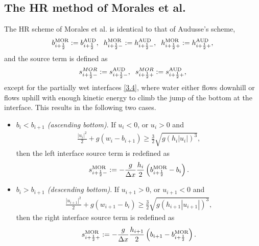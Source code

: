 \documentclass[11pt,a4paper,center,notitlepage]{article}
\numberwithin{equation}{section}
\begin{document}
\subsection{The HR method of Morales et al.}
The HR scheme of Morales et al. \cite{Morales2013} is identical to that of Audusse's scheme,
\begin{align}
b_{i + \frac{1}{2}}^{\rm MOR}: = b_{i + \frac{1}{2}}^{\rm AUD}, \hspace{2mm} h_{i + \frac{1}{2} - }^{\rm MOR}: = h_{i + \frac{1}{2} - }^{\rm AUD}, \hspace{2mm} h_{i + \frac{1}{2} + }^{\rm MOR}: = h_{i + \frac{1}{2} + }^{\rm AUD},
\end{align}
and the source term is defined as
\begin{align}
s_{i + \frac{1}{2} - }^{MOR}: = s_{i + \frac{1}{2} - }^{\rm AUD}, \hspace{2mm} s_{i + \frac{1}{2} + }^{MOR}: = s_{i + \frac{1}{2} + }^{\rm AUD},
\end{align}
except for the partially wet interfaces \eqref{3.4}, where water either flows downhill or flows uphill with enough kinetic energy to climb the jump of the bottom at the interface. This results in the following two cases.
\begin{itemize}
\item \textit{$b_i < b_{i+1}$ (ascending bottom)}. If $u_i <0$, or $u_i >0$ and 
\begin{align}
\label{3.12}
\frac{{{{\left| {{u_i}} \right|}^2}}}{2} + g\left( {{w_i} - {b_{i + 1}}} \right) \ge \frac{3}{2}\sqrt {g{{\left( {{h_i}\left| {{u_i}} \right|} \right)}^3}} ,
\end{align}
then the left interface source term is redefined as 
\begin{align}
s_{i + \frac{1}{2} - }^{\rm MOR}: =  - \frac{g}{{\Delta x}}\frac{{{h_i}}}{2}\left( {b_{i + \frac{1}{2}}^{\rm MOR} - {b_i}} \right).
\end{align}
\item \textit{$b_i > b_{i+1}$ (descending bottom)}. If $u_{i+1} >0$, or $u_{i+1}<0$ and 
\begin{align}
\label{3.14}
\frac{{{{\left| {{u_{i + 1}}} \right|}^2}}}{2} + g\left( {{w_{i + 1}} - {b_i}} \right) \ge \frac{3}{2}\sqrt {g{{\left( {{h_{i + 1}}\left| {{u_{i + 1}}} \right|} \right)}^3}} ,
\end{align} 
then the right interface source term is redefined as 
\begin{align}
s_{i + \frac{1}{2} + }^{\rm MOR}: =  - \frac{g}{{\Delta x}}\frac{{{h_{i + 1}}}}{2}\left( {{b_{i + 1}} - b_{i + \frac{1}{2}}^{\rm MOR}} \right).
\end{align}
\end{itemize}
\end{document}
